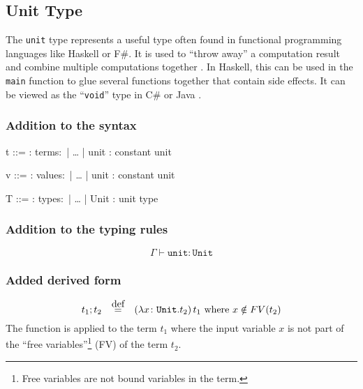 \subsection{Unit Type}

The \texttt{unit} type represents a useful type often found in functional
programming languages like Haskell or F\#. It is used to ``throw away'' a
computation result and combine multiple computations together \cite{pierce2002ProgLang}.
In Haskell, this can be used in the \texttt{main} function to glue
several functions together that contain side effects. It can be viewed as
the ``\texttt{void}'' type in C\# or Java \cite{pierce2002ProgLang}.

\subsubsection{Addition to the syntax \cite{pierce2002ProgLang}}
\begin{bnfgrammar}
    t ::= : terms$\colon$
    | \dots
    | unit : constant unit
\end{bnfgrammar}\leavevmode\newline

\begin{bnfgrammar}
    v ::= : values$\colon$
    | \dots
    | unit : constant unit
\end{bnfgrammar}\leavevmode\newline

\begin{bnfgrammar}
    T ::= : types$\colon$
    | \dots
    | Unit : unit type
\end{bnfgrammar}\leavevmode\newline

\subsubsection{Addition to the typing rules \cite{pierce2002ProgLang}}
\begin{equation*}
    \tag{Unit}
    \Gamma \vdash \texttt{unit} \colon \texttt{Unit}
\end{equation*}\leavevmode\newline

\subsubsection{Added derived form \cite{pierce2002ProgLang}}
\begin{equation*}
    t_1 ; t_2 \quad \defeq \quad (\lambda x \colon \texttt{Unit} . t_2)\,t_1 \text{ where } x \notin FV(t_2)
\end{equation*}
The function is applied to the term $t_1$ where the input variable $x$ is not
part of the ``free variables''\footnote{Free variables are not bound variables in the term.}
(FV) of the term $t_2$.

